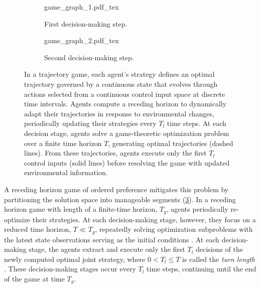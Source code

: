 \begin{figure}
    \centering
\vspace{.5em}
    \begin{subfigure}[t]{0.38\linewidth}
        {\fontsize{9.9}{11.9}\selectfont
        \def\svgwidth{\linewidth}
        {game_graph_1.pdf_tex}}%
        \caption{First decision-making step.}
        \label{fig:game_graph_1}
    \end{subfigure}
    \hspace{\fill}
    \begin{subfigure}[t]{0.60\linewidth}
        {\fontsize{9.9}{11.9}\selectfont
        \def\svgwidth{\linewidth}
        {game_graph_2.pdf_tex}}%
        \caption{Second decision-making step.}
        \label{fig:game_graph_2}
    \end{subfigure}
    
    \caption{
        In a trajectory game, each agent's strategy defines an optimal
        trajectory governed by a continuous state that evolves through actions
        selected from a continuous control input space at discrete time
        intervals. Agents compute a receding horizon to dynamically adapt their
        trajectories in response to environmental changes, periodically updating
        their strategies every $T_l$ time steps. At each decision stage, agents
        solve a game-theoretic optimization problem over a finite time horizon
        $T$, generating optimal trajectories (dashed lines). From these
        trajectories, agents execute only the first $T_l$ control inputs
        (solid lines) before resolving the game with updated environmental
        information.}
    \label{fig:game_graph}
\end{figure}

A receding horizon game of ordered preference mitigates this problem
by partitioning the solution space into manageable segments (\cref{fig:game_graph}).
In a receding horizon game
with length of a finite-time horizon, \(T_g\), agents periodically re-optimize their strategies.
At each decision-making stage, however, they focus on a reduced time horizon, \(T \ll T_g\),
repeatedly solving optimization subproblems
with the latest state observations serving
as the initial conditions \cite{christophersen:2007}.
At each decision-making stage, the agents extract and execute only the first \(T_l\) decisions
of the newly computed optimal joint strategy,
where \(0 < T_l \leq T\) is called
the \emph{turn length} \cite{peters:2025}.
These decision-making stages occur every \(T_l\) time steps,
continuing until the end of the game at time \(T_g\).

